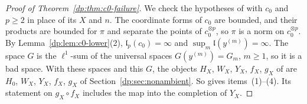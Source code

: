 \documentclass[11pt]{amsart}
\theoremstyle{definition}
\theoremstyle{remark}
\numberwithin{equation}{section}
\theoremstyle{plain}
\theoremstyle{definition}
\theoremstyle{plain}
\begin{document}
\begin{proof}[Proof of Theorem~\ref{dp:thm:c0-failure}]
We check the hypotheses of \cite[Proposition~14.18]{I} with $c_0$ and $p\ge2$ in place of its $X$ and $n$. The coordinate forms of $c_0$ are bounded, and their products are bounded for $\pi$ and separate the points of $c_0^{\otimes p}$, so $\pi$ is a norm on $c_0^{\otimes p}$. By Lemma~\ref{dp:lem:c0-lower}(2), $\mathfrak l_p(c_0)=\infty$ and $\sup_m\mathfrak l(y^{(m)})=\infty$. The space $G$ is the $\ell^1$-sum of the universal spaces $G(y^{(m)})=G_m$, $m\ge1$, so it is a bad space. With these spaces and this $G$, the objects $H_X$, $W_X$, $Y_X$, $f_X$, $g_X$ of \cite[Definition~14.15]{I} are $H_0$, $W_X$, $Y_X$, $f_X$, $g_X$ of Section~\ref{dp:sec:nonambient}. So \cite[Proposition~14.18]{I} gives items~(1)--(4). Its statement on $g_X\circ f_X$ includes the map into the completion of $Y_X$.
\end{proof}
\end{document}
